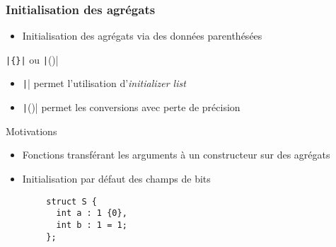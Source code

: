 \documentclass[C++.tex]{subfiles}
\begin{document}
\begin{frame}[fragile]
	\frametitle{Initialisation des agrégats}
	\begin{itemize}
		\item Initialisation des agrégats via des données parenthésées
	\end{itemize}

	\begin{block}{\texttt{|\{\}|} ou \texttt|()|}
		\begin{itemize}
			\item \texttt|{}| permet l'utilisation d'\textit{initializer list}
			\item \texttt|()| permet les conversions avec perte de précision
		\end{itemize}
	\end{block}

	\begin{block}{Motivations}
		\begin{itemize}
			\item Fonctions transférant les arguments à un constructeur sur des agrégats
		\end{itemize}
	\end{block}


	\begin{itemize}
		\item Initialisation par défaut des champs de bits
	\end{itemize}

	\begin{verbatim}
		struct S {
		  int a : 1 {0},
		  int b : 1 = 1;
		};
	\end{verbatim}


\end{frame}
\end{document}
